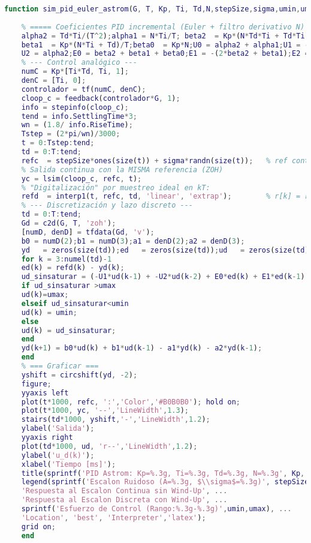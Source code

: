 \onecolumn
\begin{lstlisting}[language=Matlab,style=matlabstyle, caption={Función para la simulación del PID de  Astr\"om discreto con saturación y ruido.}, label={lst:mat6}]
	function sim_pid_euler_astrom(G, T, Kp, Ti, Td,N,stepSize,sigma,umin,umax)
	
	% ===== Coeficientes PID incremental (Euler + filtro derivativo N) =====
	alpha2 = Td*Ti/(T^2);alpha1 = N*Ti/T; beta2  = Kp*(N*Td*Ti + Td*Ti)/(T^2);
	beta1  = Kp*(N*Ti + Td)/T;beta0  = Kp*N;U0 = alpha2 + alpha1;U1 = -(2*alpha2 + alpha1);
	U2 = alpha2;E0 = beta2 + beta1 + beta0;E1 = -(2*beta2 + beta1);E2 = beta2;
	% --- Control analógico ---
	numC = Kp*[Ti*Td, Ti, 1];
	denC = [Ti, 0];
	controlador = tf(numC, denC);
	cloop_c = feedback(controlador*G, 1);
	info = stepinfo(cloop_c);
	tend = info.SettlingTime*3;
	wn = (1.8/ info.RiseTime);
	Tstep = (2*pi/wn)/3000;
	t = 0:Tstep:tend;
	td = 0:T:tend;
	refc  = stepSize*ones(size(t)) + sigma*randn(size(t));   % ref continua
	% Salida continua con la MISMA referencia (ZOH)
	yc = lsim(cloop_c, refc, t);
	% "Digitalización" por muestreo ideal en kT:
	refd  = interp1(t, refc, td, 'linear', 'extrap');        % r[k] = r_c(kT)
	% --- Discretización y lazo discreto ---
	td = 0:T:tend;
	Gd = c2d(G, T, 'zoh');
	[numD, denD] = tfdata(Gd, 'v');
	b0 = numD(2);b1 = numD(3);a1 = denD(2);a2 = denD(3);
	yd   = zeros(size(td));ed   = zeros(size(td));ud   = zeros(size(td));
	for k = 3:numel(td)-1
	ed(k) = refd(k) - yd(k);
	ud_sinsaturar = (-U1*ud(k-1) + -U2*ud(k-2) + E0*ed(k) + E1*ed(k-1) + E2*ed(k-2))/U0;
	if ud_sinsaturar >umax
	ud(k)=umax;
	elseif ud_sinsaturar<umin
	ud(k) = umin;
	else
	ud(k) = ud_sinsaturar;
	end
	yd(k+1) = b0*ud(k) + b1*ud(k-1) - a1*yd(k) - a2*yd(k-1);
	end
	% === Graficar ===
	yshift = circshift(yd, -2);
	figure;
	yyaxis left
	plot(t*1000, refc, ':','Color','#B0B0B0'); hold on;
	plot(t*1000, yc, '--','LineWidth',1.3);
	stairs(td*1000, yshift,'-','LineWidth',1.2);
	ylabel('Salida');
	yyaxis right
	plot(td*1000, ud, 'r--','LineWidth',1.2);
	ylabel('u_d(k)');
	xlabel('Tiempo [ms]');
	title(sprintf('PID Astrom: Kp=%.3g, Ti=%.3g, Td=%.3g, N=%.3g', Kp, Ti, Td,N));
	legend(sprintf('Escalon Ruidoso (A=%.3g, $\\sigma$=%.3g)', stepSize, sigma), ...
	'Respuesta al Escalon Continua sin Wind-Up', ...
	'Respuesta al Escalon Discreta con Wind-Up', ...
	sprintf('Esfuerzo de Control (Rango:%.3g-%.3g)',umin,umax), ...
	'Location', 'best', 'Interpreter','latex');
	grid on;
	end
\end{lstlisting}



